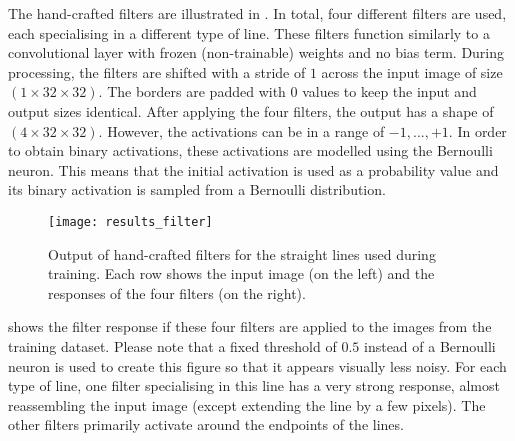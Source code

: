 The hand-crafted filters are illustrated in .
In total, four different filters are used, each specialising in a different type of line.
These filters function similarly to a convolutional layer with frozen (non-trainable) weights and no bias term. 
During processing, the filters are shifted with a stride of $1$ across the input image of size $(1 \times 32 \times 32)$. 
The borders are padded with $0$ values to keep the input and output sizes identical.
After applying the four filters, the output has a shape of $(4 \times 32 \times 32)$. 
However, the activations can be in a range of $-1, ..., +1$.
In order to obtain binary activations, these activations are modelled using the Bernoulli neuron.
This means that the initial activation is used as a probability value and its binary activation is sampled from a Bernoulli distribution.


\begin{figure}[h]
    \centering
    \texttt{[image: results\_filter]}
    \caption[Output of hand-crafted filters for straight lines]{Output of hand-crafted filters for the straight lines used during training. Each row shows the input image (on the left) and the responses of the four filters (on the right).}
\end{figure}

 shows the filter response if these four filters are applied to the images from the training dataset.
Please note that a fixed threshold of $0.5$ instead of a Bernoulli neuron is used to create this figure so that it appears visually less noisy.
For each type of line, one filter specialising in this line has a very strong response, almost reassembling the input image (except extending the line by a few pixels).
The other filters primarily activate around the endpoints of the lines.


